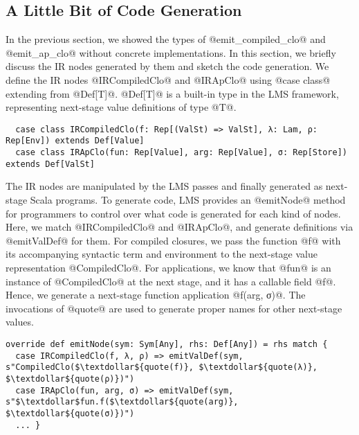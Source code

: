 \subsection{A Little Bit of Code Generation}

In the previous section, we showed the types of @emit_compiled_clo@ and
@emit_ap_clo@ without concrete implementations. In this section, we briefly
discuss the IR nodes generated by them and sketch the code generation.
We define the IR nodes @IRCompiledClo@ and @IRApClo@ using @case class@
extending from @Def[T]@. @Def[T]@ is a built-in type in the LMS framework,
representing next-stage value definitions of type @T@.
\begin{lstlisting}
  case class IRCompiledClo(f: Rep[(ValSt) => ValSt], λ: Lam, ρ: Rep[Env]) extends Def[Value]
  case class IRApClo(fun: Rep[Value], arg: Rep[Value], σ: Rep[Store]) extends Def[ValSt]
\end{lstlisting}

The IR nodes are manipulated by the LMS passes and finally generated as
next-stage Scala programs. To generate code, LMS provides an @emitNode@ method for
programmers to control over what code is generated for each kind of nodes. Here,
we match @IRCompiledClo@ and @IRApClo@, and generate definitions via
@emitValDef@ for them.  For compiled closures, we pass the function @f@ with its
accompanying syntactic term and environment to the next-stage value
representation @CompiledClo@. For applications, we know that @fun@ is
an instance of @CompiledClo@ at the next stage, and it has a callable field
@f@. Hence, we generate a next-stage function application @f(arg, σ)@.  The
invocations of @quote@ are used to generate proper names for other
next-stage values.
\begin{lstlisting}
override def emitNode(sym: Sym[Any], rhs: Def[Any]) = rhs match {
  case IRCompiledClo(f, λ, ρ) => emitValDef(sym, s"CompiledClo($\textdollar${quote(f)}, $\textdollar${quote(λ)}, $\textdollar${quote(ρ)})")
  case IRApClo(fun, arg, σ) => emitValDef(sym, s"$\textdollar$fun.f($\textdollar${quote(arg)}, $\textdollar${quote(σ)})")
  ... }
\end{lstlisting}

